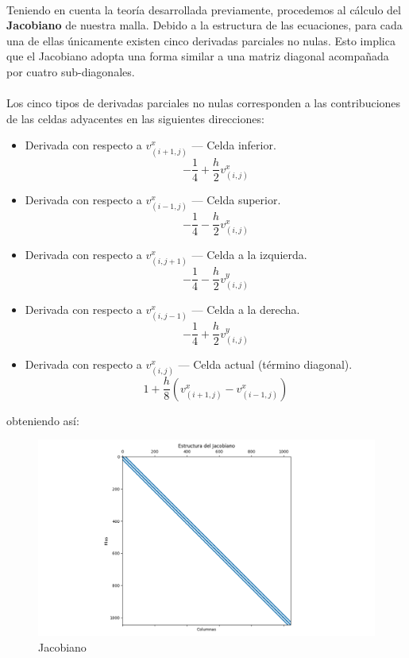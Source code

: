 \documentclass{article}
\begin{document}
  \paragraph{}
  Teniendo en cuenta la teoría desarrollada previamente, procedemos al cálculo del \textbf{Jacobiano} de nuestra malla. Debido a la estructura de las ecuaciones, para cada una de ellas únicamente existen cinco derivadas parciales no nulas. Esto implica que el Jacobiano adopta una forma similar a una matriz diagonal acompañada por cuatro sub-diagonales.

  \paragraph{}
  Los cinco tipos de derivadas parciales no nulas corresponden a las contribuciones de las celdas adyacentes en las siguientes direcciones:
  \begin{itemize}
      \item Derivada con respecto a \(v_{(i+1, j)}^x\) — Celda inferior.
      \[-\frac{1}{4}+\frac{h}{2}v_{(i,j)}^x\]
      \item Derivada con respecto a \(v_{(i-1, j)}^x\) — Celda superior.
      \[-\frac{1}{4}-\frac{h}{2}v_{(i,j)}^x\]
      \item Derivada con respecto a \(v_{(i, j+1)}^x\) — Celda a la izquierda.
      \[-\frac{1}{4}-\frac{h}{2}v_{(i,j)}^y\]
      \item Derivada con respecto a \(v_{(i, j-1)}^x\) — Celda a la derecha.
      \[-\frac{1}{4}+\frac{h}{2}v_{(i,j)}^y\]
      \item Derivada con respecto a \(v_{(i, j)}^x\) — Celda actual (término diagonal).
      \[1+\frac{h}{8}(v_{(i+1,j)}^x-v_{(i-1,j)}^x)\]
  \end{itemize}

  obteniendo así:

  \begin{figure}[H]
    \centering
    \includegraphics[width=1\textwidth]{Jacobiano.png}
    \caption{Jacobiano}
  \end{figure}
\end{document}
